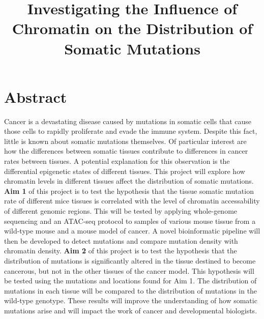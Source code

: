 \documentclass[12pt]{article}
\title{Investigating the Influence of Chromatin on the Distribution of Somatic Mutations}
\date{}
\begin{document}
\maketitle





\section{Abstract}
Cancer is a devastating disease caused by mutations in somatic cells that cause those cells to rapidly proliferate and evade the immune system. Despite this fact, little is known about somatic mutations themselves.
Of particular interest are how the differences between somatic tissues contribute to differences in cancer rates between tissues.
A potential explanation for this observation is the differential epigenetic states of different tissues.
This project will explore how chromatin levels in different tissues affect the distribution of somatic mutations.
\textbf{Aim 1} of this project is to test the hypothesis that the tissue somatic mutation rate of different mice tissues is correlated with the level of chromatin accessability of different genomic regions.
This will be tested by applying whole-genome sequencing and an ATAC-seq protocol to samples of various mouse tissue from a wild-type mouse and a mouse model of cancer.
A novel bioinformatic pipeline will then be developed to detect mutations and compare mutation density with chromatin density.
\textbf{Aim 2} of this project is to test the hypothesis that the distribution of mutations is significantly altered in the tissue destined to become cancerous, but not in the other tissues of the cancer model.
This hypothesis will be tested using the mutations and locations found for Aim 1.
The distribution of mutations in each tissue will be compared to the distribution of mutations in the wild-type genotype.
These results will improve the understanding of how somatic mutations arise and will impact the work of cancer and developmental biologists.
\end{document}
